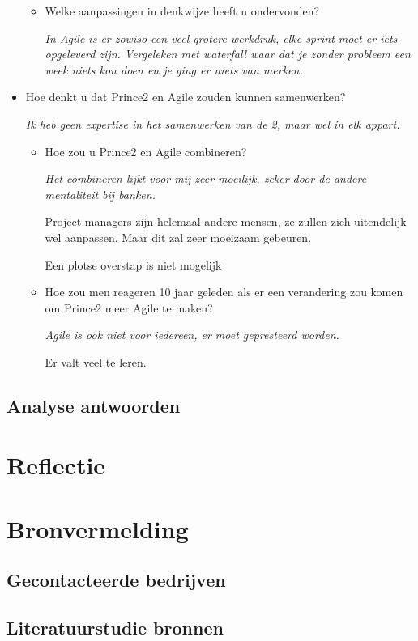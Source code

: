 \documentclass[]{article}
\begin{document}
\begin{itemize}
	\begin{itemize}
		\item Welke aanpassingen in denkwijze heeft u ondervonden?
		
		{\it 
			In Agile is er zowiso een veel grotere werkdruk, elke sprint moet er iets opgeleverd zijn. Vergeleken met waterfall waar dat je zonder probleem een week niets kon doen en je ging er niets van merken.
		}
	\end{itemize}
	\item Hoe denkt u dat Prince2 en Agile zouden kunnen samenwerken?
	
	{\it 
		Ik heb geen expertise in het samenwerken van de 2, maar wel in elk appart.
	}
	\begin{itemize}
		\item Hoe zou u Prince2 en Agile combineren?
		
		{\it 
			Het combineren lijkt voor mij zeer moeilijk, zeker door de andere mentaliteit bij banken. 
			
			Project managers zijn helemaal andere mensen, ze zullen zich uitendelijk wel aanpassen. Maar dit zal zeer moeizaam gebeuren.
			
			Een plotse overstap is niet mogelijk
	}
		\item Hoe zou men reageren 10 jaar geleden als er een verandering zou komen om Prince2 meer Agile te maken?
		
		{\it 
			Agile is ook niet voor iedereen, er moet gepresteerd worden.
			
			Er valt veel te leren.
		}
	\end{itemize}
\end{itemize}
\subsection{Analyse antwoorden}


\section{Reflectie}

\section{Bronvermelding}

\subsection{Gecontacteerde bedrijven}

\subsection{Literatuurstudie bronnen}
\printbibliography
\end{document}
